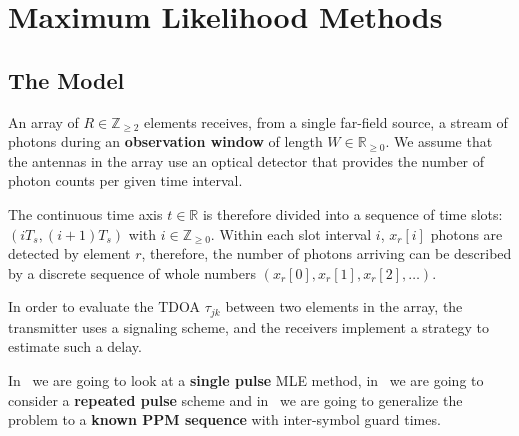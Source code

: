 \chapter{Maximum Likelihood Methods}\label{ch:MLEmethods}

\section{The Model}\label{sec:Model}

An array of \(R \in \mathbb{Z}_{\geq2}\) elements receives, from a single far-field source, a stream of photons during an \textbf{observation window }of length \(W\in\mathbb{R}_{\geq0}\).
We assume that the antennas in the array use an optical detector that provides the number of photon counts per given time interval.

\noindent
The continuous time axis \(t \in \mathbb{R}\) is therefore divided into a sequence of time slots: \((iT_s,(i+1)T_s)\) with \(i \in \mathbb{Z}_{\geq0}\). Within each slot interval \(i\), \(x_r[i]\) photons are detected by element \(r\), therefore, the number of photons arriving can be described by a discrete sequence of whole numbers \((x_r[0],x_r[1],x_r[2],\ldots)\).

\noindent
In order to evaluate the TDOA \(\tau_{jk}\) between two elements in the array, the transmitter uses a signaling scheme, and the receivers implement a strategy to estimate such a delay. 

\noindent
In~ we are going to look at a \textbf{single pulse} MLE method, in~ we are going to consider a \textbf{repeated pulse} scheme and in~ we are going to generalize the problem to a \textbf{known PPM sequence} with inter-symbol guard times.
